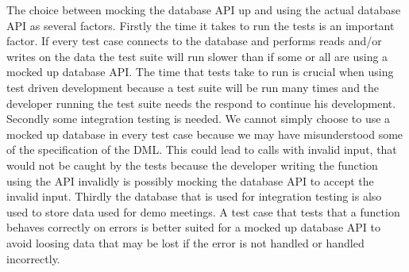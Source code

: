 The choice between mocking the database API up and using the actual database API as several factors.
Firstly the time it takes to run the tests is an important factor.
If every test case connects to the database and performs reads and/or writes on the data the test suite will run slower than if some or all are using a mocked up database API.
The time that tests take to run is crucial when using test driven development because a test suite will be run many times and the developer running the test suite needs the respond to continue his development.
Secondly some integration testing is needed.
We cannot simply choose to use a mocked up database in every test case because we may have misunderstood some of the specification of the \moodle{} DML.
This could lead to calls with invalid input, that would not be caught by the tests because the developer writing the function using the API invalidly is possibly mocking the database API to accept the invalid input.
Thirdly the database that is used for integration testing is also used to store data used for demo meetings.
A test case that tests that a function behaves correctly on errors is better suited for a mocked up database API to avoid loosing data that may be lost if the error is not handled or handled incorrectly.
\FloatBarrier